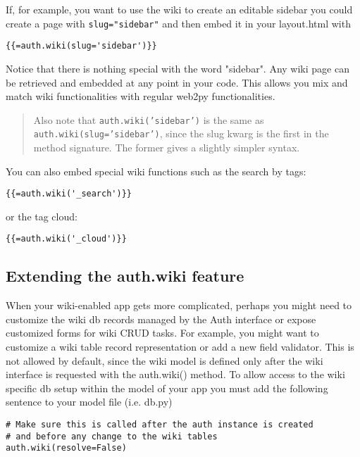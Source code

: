 \documentclass[justified,sixbynine,notoc]{tufte-book}
\def\ft{\small\tt}
\begin{document}
\begin{fullwidth}
If, for example, you want to use the wiki to create an editable sidebar you could create a page with {\ft slug="sidebar"} and then embed it in your layout.html with

\begin{lstlisting}[keywords={}]
{{=auth.wiki(slug='sidebar')}}
\end{lstlisting}

Notice that there is nothing special with the word "sidebar". Any wiki page can be retrieved and embedded at any point in your code. This allows you mix and match wiki functionalities with regular web2py functionalities.

\begin{quote}Also note that {\ft auth.wiki('sidebar')} is the same as {\ft auth.wiki(slug='sidebar')}, since the slug kwarg is the first in the method signature. The former gives a slightly simpler syntax.\end{quote}
You can also embed special wiki functions such as the search by tags:

\begin{lstlisting}[keywords={}]
{{=auth.wiki('_search')}}
\end{lstlisting}
\noindent or the tag cloud:

\begin{lstlisting}[keywords={}]
{{=auth.wiki('_cloud')}}
\end{lstlisting}

\goodbreak\subsection{Extending the auth.wiki feature}

When your wiki-enabled app gets more complicated, perhaps you might need to customize the wiki db records managed by the Auth interface or expose customized forms for wiki CRUD tasks. For example, you might want to customize a wiki table record representation or add a new field validator. This is not allowed by default, since the wiki model is defined only after the wiki interface is requested with the auth.wiki() method. To allow access to the wiki specific db setup within the model of your app you must add the following sentence to your model file (i.e. db.py)

\begin{lstlisting}
# Make sure this is called after the auth instance is created
# and before any change to the wiki tables
auth.wiki(resolve=False)
\end{lstlisting}


\end{fullwidth}
\end{document}
